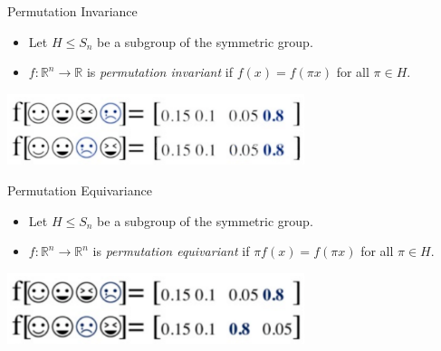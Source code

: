\documentclass{beamer}
\begin{document}
\begin{frame}{Permutation Invariance}

    \begin{itemize}
        \setlength{\itemsep}{\fill}
        \item Let $H \leq S_n$ be a subgroup of the symmetric group.
        \item $f:\mathbb{R}^n \rightarrow \mathbb{R}$ is \textit{permutation invariant} if $f(x) = f(\pi x)$ for all $\pi \in H$.
    \end{itemize}
    \begin{center}
        \includegraphics[width=0.65\textwidth]{../figures/perm_in.png}
    \end{center}
    
\end{frame}



\begin{frame}{Permutation Equivariance}

    \begin{itemize}
        \setlength{\itemsep}{\fill}
        \item Let $H \leq S_n$ be a subgroup of the symmetric group.
        \item $f:\mathbb{R}^n \rightarrow \mathbb{R}^n$ is \textit{permutation equivariant} if $\pi f(x) = f(\pi x)$ for all $\pi \in H$.
    \end{itemize}
    \begin{center}
        \includegraphics[width=0.65\textwidth]{../figures/perm_eq.png}
    \end{center}
    
\end{frame}
\end{document}
